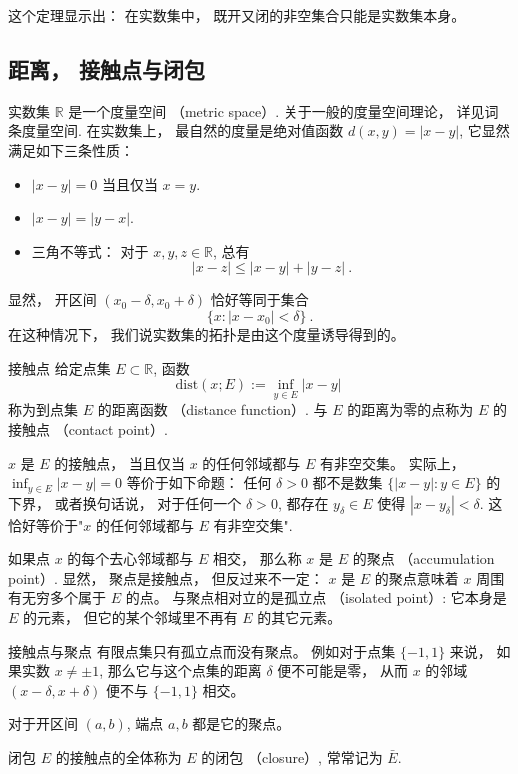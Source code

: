 这个定理显示出： 在实数集中， 既开又闭的非空集合只能是实数集本身。

\subsection{距离， 接触点与闭包}
实数集 $\mathbb{R}$ 是一个度量空间 （metric space）. 关于一般的度量空间理论， 详见词条度量空间. 在实数集上， 最自然的度量是绝对值函数 $d(x,y)=|x-y|$, 它显然满足如下三条性质：

\begin{itemize}
\item $|x-y|=0$ 当且仅当 $x=y$.
\item $|x-y|=|y-x|$.
\item 三角不等式： 对于 $x,y,z\in\mathbb{R}$, 总有
$$
|x-z|\leq|x-y|+|y-z|~.
$$
\end{itemize}

显然， 开区间 $(x_0-\delta,x_0+\delta)$ 恰好等同于集合
$$
\{x:|x-x_0|<\delta\}~.
$$
在这种情况下， 我们说实数集的拓扑是由这个度量诱导得到的。

\begin{definition}{接触点}
给定点集 $E\subset\mathbb{R}$, 函数
$$
\text{dist}(x;E):=\inf_{y\in E}|x-y|~
$$
称为到点集 $E$ 的距离函数 （distance function）. 与 $E$ 的距离为零的点称为 $E$ 的接触点 （contact point）. 
\end{definition}
$x$ 是 $E$ 的接触点， 当且仅当 $x$ 的任何邻域都与 $E$ 有非空交集。 实际上， $\inf_{y\in E}|x-y|=0$ 等价于如下命题： 任何 $\delta>0$ 都不是数集 $\{|x-y|:y\in E\}$ 的下界， 或者换句话说， 对于任何一个 $\delta>0$, 都存在 $y_\delta\in E$ 使得 $|x-y_\delta|<\delta$. 这恰好等价于"$x$ 的任何邻域都与 $E$ 有非空交集".

如果点 $x$ 的每个去心邻域都与 $E$ 相交， 那么称 $x$ 是 $E$ 的聚点 （accumulation point）. 显然， 聚点是接触点， 但反过来不一定： $x$ 是 $E$ 的聚点意味着 $x$ 周围有无穷多个属于 $E$ 的点。 与聚点相对立的是孤立点 （isolated point）: 它本身是 $E$ 的元素， 但它的某个邻域里不再有 $E$ 的其它元素。

\begin{example}{接触点与聚点}
有限点集只有孤立点而没有聚点。 例如对于点集 $\{-1,1\}$ 来说， 如果实数 $x\neq\pm1$, 那么它与这个点集的距离 $\delta$ 便不可能是零， 从而 $x$ 的邻域 $(x-\delta,x+\delta)$ 便不与 $\{-1,1\}$ 相交。

对于开区间 $(a,b)$, 端点 $a,b$ 都是它的聚点。
\end{example}

\begin{definition}{闭包}
$E$ 的接触点的全体称为 $E$ 的闭包 （closure）, 常常记为 $\bar E$.
\end{definition}

